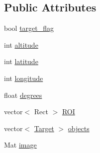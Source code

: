 \subsection*{Public Attributes}
\begin{DoxyCompactItemize}
\item 
bool \hyperlink{classDimage_aa0e2203121319a2f3d5461a8ec161694}{target\-\_\-flag}
\item 
int \hyperlink{classDimage_ad9ebd4c340098de74c0971be6161f194}{altitude}
\item 
int \hyperlink{classDimage_a518750ead775e0dc036fe5885069dbf2}{latitude}
\item 
int \hyperlink{classDimage_abf468948c7b45b33fe37e653ca96c33d}{longitude}
\item 
float \hyperlink{classDimage_a6d13db78abfb30ba2829badef047a632}{degrees}
\item 
vector$<$ Rect $>$ \hyperlink{classDimage_a84e08d484952cbe4f1375826924f1ee9}{R\-O\-I}
\item 
vector$<$ \hyperlink{structTarget}{Target} $>$ \hyperlink{classDimage_a63f52e6d093db216a710643fb9852af0}{objects}
\item 
Mat \hyperlink{classDimage_a0da4164eece652cf86fc8ec27e2df086}{image}
\end{DoxyCompactItemize}


